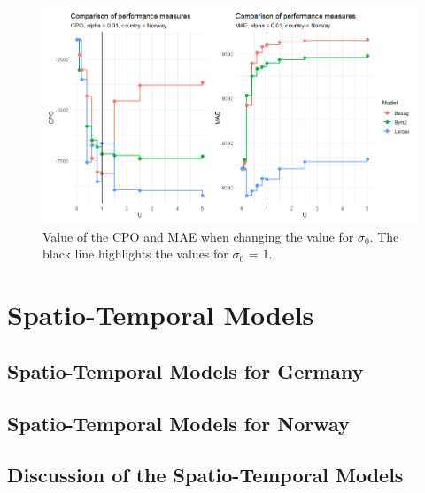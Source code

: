 %     
\begin{figure}[H]
    \centering
    \includegraphics[width = \textwidth]{comparison_2_norway.png}
    \caption{Value of the CPO and MAE when changing the value for $\sigma_0$. The black line highlights the values for $\sigma_0$ = 1.}
    \label{comparison_norway_2}
\end{figure}
%     
\section{Spatio-Temporal Models}
\subsection{Spatio-Temporal Models for Germany}
\subsection{Spatio-Temporal Models for Norway}
\subsection{Discussion of the Spatio-Temporal Models}
\clearpage
